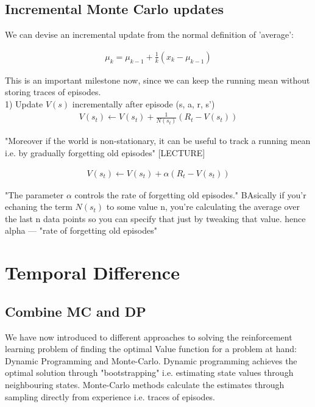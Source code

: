 \subsection{Incremental Monte Carlo updates}
We can devise an incremental update from the normal definition of 'average':

\begin{align}
    \mu_k = \mu_{k - 1} + \frac{1}{k} (x_k - \mu_{k - 1})
\end{align}

This is an important milestone now, since we can keep the running mean without storing traces of episodes. \\

1) Update $V(s)$ incrementally after episode (s, a, r, s')\\
\begin{align}
    V(s_t) \longleftarrow V(s_t) + \frac{1}{N(s_t)}(R_t - V(s_t))
\end{align}

"Moreover if the world is non-stationary, it can be useful to track a running mean i.e. by gradually forgetting old episodes" [LECTURE]

\begin{align}
    V(s_t) \longleftarrow V(s_t) + \alpha (R_t - V(s_t)) \label{eq:mc_increment}
\end{align}

"The parameter $\alpha$ controls the rate of forgetting old episodes." BAsically if you'r echaning the term $N(s_t)$ to some value n, you're calculating the average over the last n data points so you can specify that just by tweaking that value. hence alpha — "rate of forgetting old episodes"

\section{Temporal Difference}

\subsection{Combine MC and DP}
We have now introduced to different approaches to solving 
the reinforcement learning problem of finding the optimal 
Value function for a problem at hand: Dynamic Programming and 
Monte-Carlo. Dynamic programming achieves the optimal solution
through "bootstrapping" i.e. estimating state values through
neighbouring states. Monte-Carlo methods calculate the estimates through sampling directly from experience i.e. traces of episodes. \\

